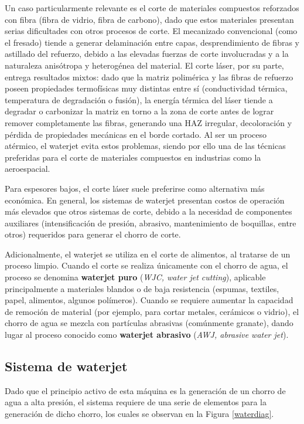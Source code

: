 Un caso particularmente relevante es el corte de materiales compuestos  reforzados con fibra (fibra de vidrio, fibra de carbono), dado que estos materiales presentan serias dificultades con otros procesos de corte. El mecanizado convencional (como el fresado) tiende a generar delaminación entre capas, desprendimiento de fibras y astillado del refuerzo, debido a las elevadas fuerzas de corte involucradas y a la naturaleza anisótropa y heterogénea del material. El corte láser, por su parte, entrega resultados mixtos: dado que la matriz polimérica y las fibras de refuerzo poseen propiedades termofísicas muy distintas entre sí (conductividad térmica, temperatura de degradación o fusión), la energía térmica del láser tiende a degradar o carbonizar la matriz en torno a la zona de corte antes de lograr remover completamente las fibras, generando una HAZ irregular, decoloración y pérdida de propiedades mecánicas en el borde cortado. Al ser un proceso atérmico, el waterjet evita estos problemas, siendo por ello una de las técnicas preferidas para el corte de materiales compuestos en industrias como la aeroespacial.

Para espesores bajos, el corte láser suele preferirse como alternativa más económica. En general, los sistemas de waterjet presentan costos de operación más elevados que otros sistemas de corte, debido a la necesidad de componentes auxiliares (intensificación de presión, abrasivo, mantenimiento de boquillas, entre otros) requeridos para generar el chorro de corte.

Adicionalmente, el waterjet se utiliza en el corte de alimentos, al tratarse de un proceso limpio. Cuando el corte se realiza únicamente con el chorro de agua, el proceso se denomina \textbf{waterjet puro} (\textit{WJC, water jet cutting}), aplicable principalmente a materiales blandos o de baja resistencia (espumas, textiles, papel, alimentos, algunos polímeros). Cuando se requiere aumentar la capacidad de remoción de material (por ejemplo, para cortar metales, cerámicos o vidrio), el chorro de agua se mezcla con partículas abrasivas (comúnmente granate), dando lugar al proceso conocido como \textbf{waterjet abrasivo} (\textit{AWJ, abrasive water jet}).


\subsection{Sistema de waterjet}

Dado que el principio activo de esta máquina es la generación de un chorro de agua a alta presión, el sistema requiere de una serie de elementos para la generación de dicho chorro, los cuales se observan en la Figura \ref{waterdiag}.

